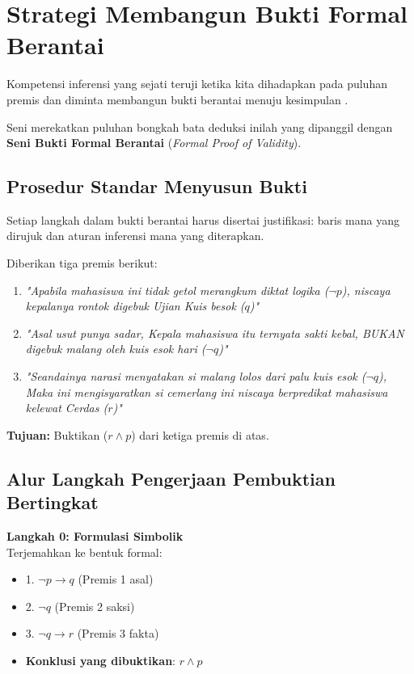 \section{Strategi Membangun Bukti Formal Berantai}

Kompetensi inferensi yang sejati teruji ketika kita dihadapkan pada puluhan premis dan diminta membangun bukti berantai menuju kesimpulan \cite{rosen2019}.

Seni merekatkan puluhan bongkah bata deduksi inilah yang dipanggil dengan \textbf{Seni Bukti Formal Berantai} (\textit{Formal Proof of Validity}).

\subsection{Prosedur Standar Menyusun Bukti}

Setiap langkah dalam bukti berantai harus disertai justifikasi: baris mana yang dirujuk dan aturan inferensi mana yang diterapkan.

\begin{contoh}
Diberikan tiga premis berikut:
\begin{enumerate}
    \item \textit{"Apabila mahasiswa ini tidak getol merangkum diktat logika ($\neg p$), niscaya kepalanya rontok digebuk Ujian Kuis besok ($q$)"}
    \item \textit{"Asal usut punya sadar, Kepala mahasiswa itu ternyata sakti kebal, BUKAN digebuk malang oleh kuis esok hari ($\neg q$)"}
    \item \textit{"Seandainya narasi menyatakan si malang lolos dari palu kuis esok ($\neg q$), Maka ini mengisyaratkan si cemerlang ini niscaya berpredikat mahasiswa kelewat Cerdas ($r$)"}
\end{enumerate}
\textbf{Tujuan:} Buktikan ($r \land p$) dari ketiga premis di atas.
\end{contoh}

\subsection{Alur Langkah Pengerjaan Pembuktian Bertingkat}

\textbf{Langkah 0: Formulasi Simbolik} \\
Terjemahkan ke bentuk formal: 
\begin{itemize}
    \item 1. $\neg p \rightarrow q$ \quad (Premis 1 asal)
    \item 2. $\neg q$ \quad (Premis 2 saksi)
    \item 3. $\neg q \rightarrow r$ \quad (Premis 3 fakta)
    \item \textbf{Konklusi yang dibuktikan}: \quad $r \land p$
\end{itemize}

